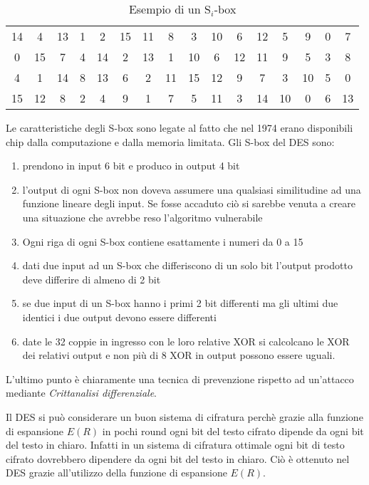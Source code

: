 \documentclass[11pt, a4paper, oneside]{Thesis} %
\begin{document}
\begin{table}[ht] 
\caption{Esempio di un S$_i$-box} %
\centering %
\begin{tabular}{c c c c c c c c c c c c c c c c} %
\hline %
14 & 4 & 13 & 1 & 2 & 15 & 11 & 8 & 3 & 10 & 6 & 12 & 5 & 9 & 0 & 7\\
0 & 15 & 7 & 4 & 14 & 2 & 13 & 1 & 10 & 6 & 12 & 11 & 9 & 5 & 3 & 8\\
4 & 1 & 14 & 8 & 13 & 6 & 2 & 11 & 15 & 12 & 9 & 7 & 3 & 10 & 5 & 0\\
15 & 12 & 8 & 2 & 4 & 9 & 1 & 7 & 5 & 11 & 3 & 14 & 10 & 0 & 6 & 13\\
\hline %
\end{tabular} 
\label{table:s_box} %
\end{table}

Le caratteristiche degli S-box sono legate al fatto che nel 1974 erano disponibili chip dalla computazione e dalla memoria limitata. Gli S-box del DES sono:
\begin{enumerate}
 \item prendono in input 6 bit e produco in output 4 bit
 \item l'output di ogni S-box non doveva assumere una qualsiasi similitudine ad una funzione lineare degli input. Se fosse accaduto ciò si sarebbe venuta a creare una situazione che avrebbe reso
 l'algoritmo vulnerabile
 \item Ogni riga di ogni S-box contiene esattamente i numeri da 0 a 15
 \item dati due input ad un S-box che differiscono di un solo bit l'output prodotto deve differire di almeno di 2 bit
 \item se due input di un S-box hanno i primi 2 bit differenti ma gli ultimi due identici i due output devono essere differenti
 \item date le 32 coppie in ingresso con le loro relative XOR si calcolcano le XOR dei relativi output e non più di 8 XOR in output possono essere uguali. 
\end{enumerate}
L'ultimo punto è chiaramente una tecnica di prevenzione rispetto ad un'attacco mediante \textit{Crittanalisi differenziale}.

Il DES si può considerare un buon sistema di cifratura perchè grazie alla funzione di espansione $E(R)$ in pochi round ogni bit del testo cifrato dipende da ogni bit del testo in chiaro.
Infatti in un sistema di cifratura ottimale ogni bit di testo cifrato dovrebbero dipendere da ogni bit del testo in chiaro. 
Ciò è ottenuto nel DES grazie all'utilizzo della funzione di espansione $E(R)$.
\end{document}
